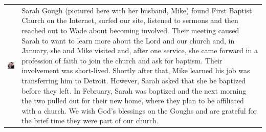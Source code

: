 
\begin{longtable}{ C D } 
\includegraphics[width=1.8in]{mugs/sarah_g} & Sarah Gough (pictured here with her husband, Mike) found First Baptist Church on the Internet, surfed our site, listened to sermons and then reached out to Wade about becoming involved.  Their meeting caused Sarah to want to learn more about the Lord and our church and, in January, she and Mike visited and, after one service, she came forward in a profession of faith to join the church and ask for baptism.  Their involvement was short-lived.  Shortly after that, Mike learned his job was transferring him to Detroit.  However, Sarah asked that she be baptized before they left.  In February, Sarah was baptized and the next morning the two pulled out for their new home, where they plan to be affiliated with a church.  We wish God's blessings on the Goughs and are grateful for the brief time they were part of our church.\\
[5ex]
\end{longtable}